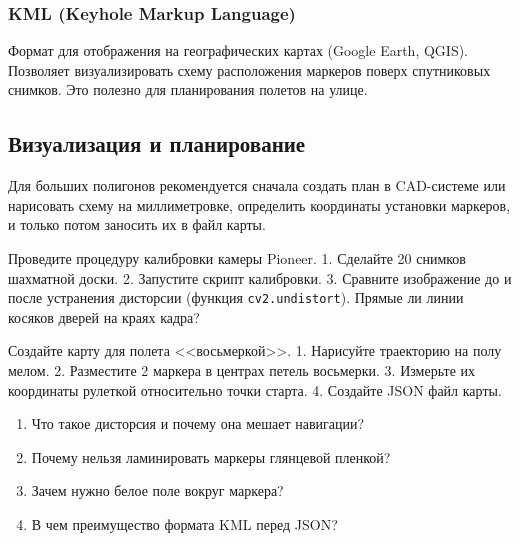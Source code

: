 \subsubsection{KML (Keyhole Markup Language)}
Формат для отображения на географических картах (Google Earth, QGIS). Позволяет визуализировать схему расположения маркеров поверх спутниковых снимков. Это полезно для планирования полетов на улице.

\subsection{Визуализация и планирование}
Для больших полигонов рекомендуется сначала создать план в CAD-системе или нарисовать схему на миллиметровке, определить координаты установки маркеров, и только потом заносить их в файл карты.

\begin{taskbox}
Проведите процедуру калибровки камеры Pioneer.
1. Сделайте 20 снимков шахматной доски.
2. Запустите скрипт калибровки.
3. Сравните изображение до и после устранения дисторсии (функция \texttt{cv2.undistort}). Прямые ли линии косяков дверей на краях кадра?
\end{taskbox}

\begin{taskbox}
Создайте карту для полета <<восьмеркой>>.
1. Нарисуйте траекторию на полу мелом.
2. Разместите 2 маркера в центрах петель восьмерки.
3. Измерьте их координаты рулеткой относительно точки старта.
4. Создайте JSON файл карты.
\end{taskbox}

\begin{questionbox}
\begin{enumerate}
    \item Что такое дисторсия и почему она мешает навигации?
    \item Почему нельзя ламинировать маркеры глянцевой пленкой?
    \item Зачем нужно белое поле вокруг маркера?
    \item В чем преимущество формата KML перед JSON?
\end{enumerate}
\end{questionbox}
